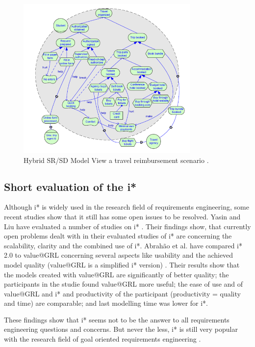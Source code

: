 \documentclass[11pt,a4paper]{article}
\begin{document}
\begin{figure}[ht]
    \centering
    \includegraphics[width=0.8\textwidth]{hybridModel.png}
    \caption{Hybrid SR/SD Model View a travel reimbursement scenario
      \cite{Dalpiaz.25.05.2016}.}
    \label{fig:my_label3}
\end{figure}

\subsection{Short evaluation of the i*}
Although i* is widely used in the research field of requirements engineering,
some recent studies show that it still has some open issues to be
resolved. Yasin and Liu have evaluated a number of studies on i*
\cite{Yasin.2017}. Their findings show, that currently open problems dealt
with in their evaluated studies of i* are concerning the scalability, clarity
and the combined use of i*. Abrah{\~a}o et al. have compared i* 2.0 to
value@GRL concerning several aspects like usability and the achieved model
quality (value@GRL is a simplified i* version) \cite{Abrahao.2019}.  Their
results show that the models created with value@GRL are significantly of
better quality; the participants in the studie found value@GRL more useful;
the ease of use and of value@GRL and i* and productivity of the participant
(productivity = quality and time) are comparable; and last modelling time was
lower for i*.

These findings show that i* seems not to be the answer to all requirements
engineering questions and concerns. But never the less, i* is still very
popular with the research field of goal oriented requirements engineering
\cite[p. 143]{Horkoff.1213.09.2016}.
\end{document}
